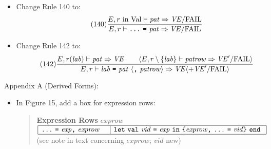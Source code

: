 \documentclass[twoside,titlepage]{article}
\begin{document}
\begin{appendix}
\begin{itemize}
\item Change Rule 140 to:
  \begin{equation}
  \tag{140}
  \frac{
  E,\mbox{$r$ in Val} \vdash \mathit{pat} \Rightarrow \mathit{VE}/\mathrm{FAIL}
  }{
  E,r \vdash \mbox{\tt...}~\mbox{\tt=}~\mathit{pat} \Rightarrow \mathit{VE}/\mathrm{FAIL}
  }
  \end{equation}

\item Change Rule 142 to:
  \begin{equation}
  \tag{142}
  \frac{
  E,r(\mathit{lab}) \vdash \mathit{pat} \Rightarrow \mathit{VE}
  \qquad
  \langle E,r\setminus\{\mathit{lab}\} \vdash \mathit{patrow} \Rightarrow \mathit{VE}'/\mathrm{FAIL}\rangle
  }{
  E,r \vdash \mathit{lab}~\mbox{\tt=}~\mathit{pat}~\langle\mbox{\tt,}~\mathit{patrow}\rangle \Rightarrow \mathit{VE}\langle+\mathit{VE}'/\mathrm{FAIL}\rangle
  }
  \end{equation}
\end{itemize}

Appendix A (Derived Forms):
\begin{itemize}
\item In Figure 15, add a box for expression rows: 
  \begin{quote}
  {\bf Expression Rows} $\mathit{exprow}$ \\
  $\begin{array}{|l|l|}
  \hline
  \mbox{\tt...}~\mbox{\tt=}~\mathit{exp}\mbox{\tt,}~\mathit{exprow}~~~
  & {\tt{let}}~{\tt{val}}~\mathit{vid}~\mbox{\tt=}~\mathit{exp}~{\tt{in}}~\mbox{\tt\{}\mathit{exprow}\mbox{\tt,}~\mbox{\tt...}~\mbox{\tt=}~\mathit{vid}\mbox{\tt\}}~{\tt{end}}~ \\
  \hline
  \end{array}$ \\
  (see note in text concerning $\mathit{exprow}$; $\mathit{vid}$ new)
  \end{quote}


\end{itemize}
\end{appendix}
\end{document}
